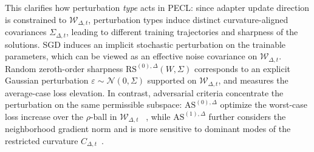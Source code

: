 \documentclass[10pt]{article} %
\begin{document}
This clarifies how perturbation \emph{type} acts in PECL: since adapter update direction is constrained to $\mathcal W_{\Delta,t}$, perturbation types induce distinct curvature-aligned covariances $\Sigma_{\Delta,t}$, leading to different training trajectories and sharpness of the solutions. 
SGD induces an implicit stochastic perturbation on the trainable parameters, which can be viewed as an effective noise covariance on $\mathcal W_{\Delta,t}$\cite{pmlr-v97-zhu19e}. Random zeroth-order sharpness $\mathrm{RS}^{(0),\Delta}(W,\Sigma)$ corresponds to an explicit Gaussian perturbation $\varepsilon\sim\mathcal N(0,\Sigma)$ supported on $\mathcal W_{\Delta,t}$, and measures the average-case loss elevation. In contrast, adversarial criteria concentrate the perturbation on the same permissible subspace: $\mathrm{AS}^{(0),\Delta}$ optimize the worst-case loss increase over the $\rho$-ball in $\mathcal W_{\Delta,t}$ ~\cite{foretSharpnessAwareMinimizationEfficiently2021}, while $\mathrm{AS}^{(1),\Delta}$ further considers the neighborhood gradient norm and is more sensitive to dominant modes of the restricted curvature $C_{\Delta,t}$~\cite{Zhang_GAM}. 
\end{document}
